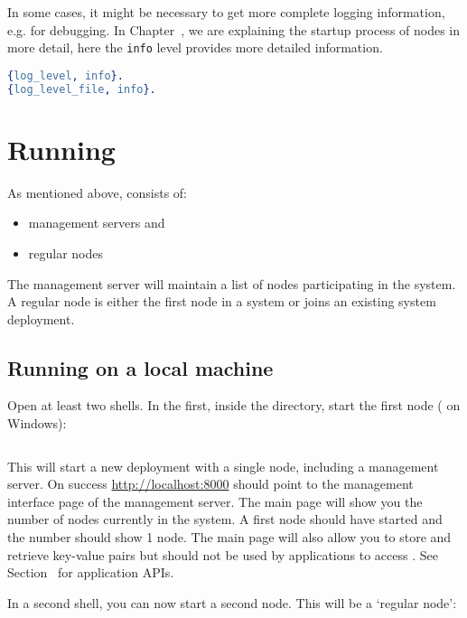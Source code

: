 In some cases, it might be necessary to get more complete logging
information, e.g. for debugging. In Chapter~,
we are explaining the startup process of \scalaris{} nodes in more
detail, here the {\tt info} level provides more detailed information.

\begin{lstlisting}[language=erlang]
%% @doc Loglevel: debug < info < warn < error < fatal < none
{log_level, info}.
{log_level_file, info}.
\end{lstlisting}


\section{Running \scalaris{}}

As mentioned above, \scalaris{} consists of:
\begin{itemize}
\setlength{\itemsep}{0pt}
\setlength{\parskip}{0pt}
\item management servers and
\item regular nodes
\end{itemize}

The management server will maintain a list of nodes participating in the
system. A regular node is either the first node in a system or joins an
existing system deployment.

\subsection{Running on a local machine}
\label{sec.boot}

Open at least two shells. In the first, inside the \scalaris{} directory,
start the first node ( on Windows):
\begin{lstlisting}[language=sh]
%> ./bin/firstnode.sh
\end{lstlisting}

This will start a new \scalaris{} deployment with a single node, including a
management server. On success \url{http://localhost:8000} should point to
the management interface page of the management server. The main page will
show you the number of nodes currently in the system.
A first \scalaris{} node should have started and the number should
show 1 node. The main page will also allow you to store and retrieve
key-value pairs but should not be used by applications to access
\scalaris{}. See Section~ for application APIs.

In a second shell, you can now start a second \scalaris{} node. This
will be a `regular node':
\begin{lstlisting}[language=sh]
%> ./bin/joining_node.sh
\end{lstlisting}

